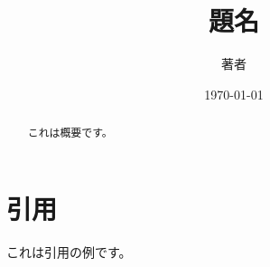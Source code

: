 \documentclass{jlreq}
\title{題名}
\author{著者}
\date{\today}
\begin{document}
\maketitle

\begin{abstract}
  これは概要です。
\end{abstract}



\section{引用}
これは引用の例です\cite{example}。

\printbibliography[title=参考文献]
\end{document}
